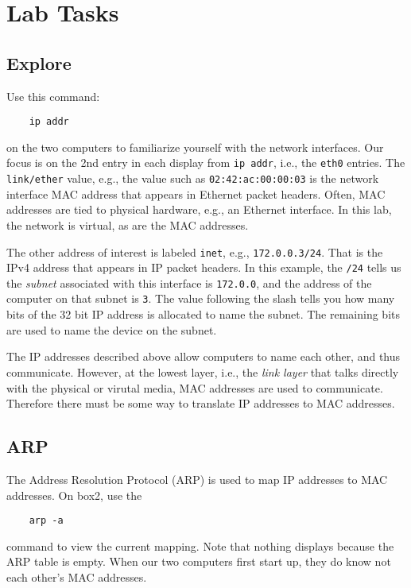 \section{Lab Tasks}
\subsection{Explore}
Use this command:
\begin{verbatim}
    ip addr
\end{verbatim}
\noindent on the two computers to familiarize yourself with the network interfaces.
Our focus is on the 2nd entry in each display from {\tt ip addr}, i.e., the {\tt eth0} entries.
The {\tt link/ether} value, e.g., the value such as {\tt 02:42:ac:00:00:03} is the network interface
MAC address that appears in Ethernet packet headers.  Often, MAC addresses are tied
to physical hardware, e.g., an Ethernet interface. In this lab, the network is virtual, as are the MAC 
addresses.

The other address of interest is 
labeled {\tt inet}, e.g., {\tt 172.0.0.3/24}.  That is the IPv4 address that appears in IP packet headers.
In this example, the {\tt /24} tells us the \textit{subnet} associated with this interface is
{\tt 172.0.0}, and the address of the computer on that subnet is {\tt 3}.  The value following the
slash tells you how many bits of the 32 bit IP address is allocated to name the subnet.  The remaining bits
are used to name the device on the subnet.

The IP addresses described above allow computers to name each other, and thus communicate.  However, at the lowest
layer, i.e., the \textit{link layer} that talks directly with the physical or virutal media, MAC addresses
are used to communicate.  Therefore there must be some way to translate IP addresses to MAC addresses.

\subsection{ARP}
The Address Resolution Protocol (ARP) is used to map IP addresses to MAC addresses.
On box2, use the 
\begin{verbatim}
    arp -a 
\end{verbatim}
\noindent command to view the current mapping.   Note that nothing displays
because the ARP table is empty.
When our two computers first start up, they do know not each other's MAC addresses.

